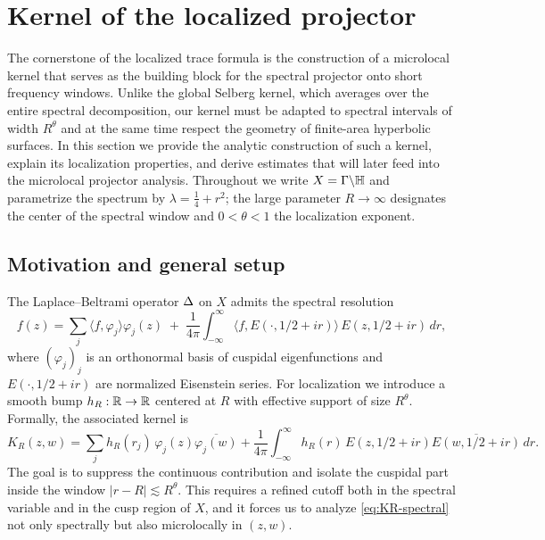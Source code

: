 \section{Kernel of the localized projector}\label{sec:kernel}

The cornerstone of the localized trace formula is the construction of a microlocal kernel that serves as the building block for the spectral projector onto short frequency windows. Unlike the global Selberg kernel, which averages over the entire spectral decomposition, our kernel must be adapted to spectral intervals of width $R^\theta$ and at the same time respect the geometry of finite-area hyperbolic surfaces. In this section we provide the analytic construction of such a kernel, explain its localization properties, and derive estimates that will later feed into the microlocal projector analysis. Throughout we write $X=\Gamma\backslash\mathbb{H}$ and parametrize the spectrum by $\lambda=\tfrac14+r^2$; the large parameter $R\to\infty$ designates the center of the spectral window and $0<\theta<1$ the localization exponent.

\subsection{Motivation and general setup}\label{subsec:kernel-setup}
The Laplace--Beltrami operator $\Delta$ on $X$ admits the spectral resolution
\[
f(z)=\sum_j \langle f,\varphi_j\rangle \varphi_j(z)
\;+\;\frac{1}{4\pi}\int_{-\infty}^{\infty} \langle f,E(\cdot,1/2+ir)\rangle \, E(z,1/2+ir)\,dr,
\]
where $(\varphi_j)_j$ is an orthonormal basis of cuspidal eigenfunctions and $E(\cdot,1/2+ir)$ are normalized Eisenstein series. For localization we introduce a smooth bump $h_R:\mathbb{R}\to\mathbb{R}$ centered at $R$ with effective support of size $R^\theta$. Formally, the associated kernel is
\begin{equation}\label{eq:KR-spectral}
K_R(z,w)
= \sum_{j} h_R(r_j) \, \varphi_j(z)\overline{\varphi_j(w)}
+ \frac{1}{4\pi}\int_{-\infty}^{\infty} h_R(r) \, E(z,1/2+ir)\overline{E(w,1/2+ir)} \, dr.
\end{equation}
The goal is to suppress the continuous contribution and isolate the cuspidal part inside the window $|r-R|\lesssim R^\theta$. This requires a refined cutoff both in the spectral variable and in the cusp region of $X$, and it forces us to analyze \eqref{eq:KR-spectral} not only spectrally but also microlocally in $(z,w)$.

